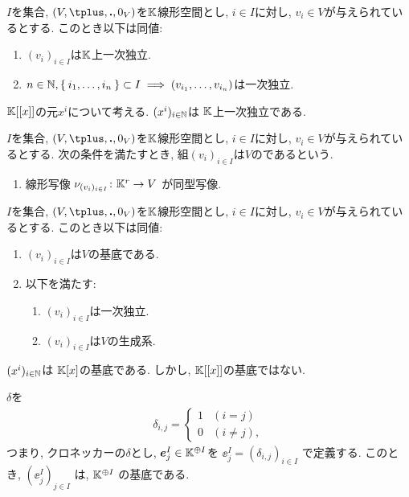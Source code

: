 \begin{prop}
  $I$を集合,
  $(V,\plus,\act,0_V)$を$\mathbb{K}$線形空間とし,
  $i\in I$に対し, $v_i\in V$が与えられているとする.
  このとき以下は同値:
  \begin{enumerate}
  \item $(v_i)_{i\in I}$は$\mathbb{K}$上一次独立.
  \item
  $n \in\mathbb{N},
  \Set{i_1,\ldots,i_n}\subset I
  \implies
  (v_{i_1},\ldots,v_{i_n})$は一次独立.
  \end{enumerate}
\end{prop}

\begin{example}
$\mathbb{K}[[x]]$の元$x^i$について考える.
$(x^i)_{i\in \mathbb{N}}$は
$\mathbb{K}$上一次独立である.
\end{example}


\begin{definition}
  $I$を集合,
  $(V,\plus,\act,0_V)$を$\mathbb{K}$線形空間とし,
  $i\in I$に対し, $v_i\in V$が与えられているとする.
  次の条件を満たすとき,
  組$(v_i)_{i\in I}$は$V$のであるという.
  \begin{enumerate}
  \item 線形写像 $\nu_{(v_i)_{i\in I}}\colon \mathbb{K}^r\to V$
    が同型写像.
  \end{enumerate}
\end{definition}
\begin{prop}
  $I$を集合,
  $(V,\plus,\act,0_V)$を$\mathbb{K}$線形空間とし,
  $i\in I$に対し, $v_i\in V$が与えられているとする.
  このとき以下は同値:
  \begin{enumerate}
  \item $(v_i)_{i\in I}$は$V$の基底である.
  \item   以下を満たす:
  \begin{enumerate}
  \item $(v_i)_{i\in I}$は一次独立.
  \item $(v_i)_{i\in I}$は$V$の生成系.
  \end{enumerate}
  \end{enumerate}
\end{prop}

\begin{example}
$(x^i)_{i\in \mathbb{N}}$は
$\mathbb{K}[x]$の基底である.
しかし,
$\mathbb{K}[[x]]$の基底ではない.
\end{example}
\begin{remark}
$\delta$を
\begin{align*}
\delta_{i,j}=
\begin{cases}
1&(i=j)\\
0&(i\neq j),
\end{cases}
\end{align*}
つまり,
クロネッカーの$\delta$とし,
$\boldsymbol{e}^I_{j}\in \mathbb{K}^{\oplus I}$を
$\ee^I_{j}=(\delta_{i,j})_{i\in I}$
で定義する.
このとき,
$(\ee^I_{j})_{j\in I}$
は,
$\mathbb{K}^{\oplus I}$
の基底である.
\end{remark}

